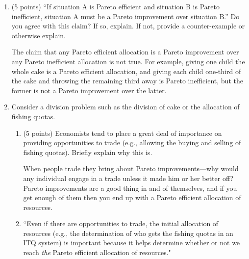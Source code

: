 \documentclass[twoside]{article}
\begin{document}
\begin{enumerate}
\item \begin{EXAM} (5 points) ``If situation A is Pareto efficient and situation B is Pareto inefficient, situation A must be a Pareto improvement over situation B.'' Do you agree with this claim? If so, explain. If not, provide a counter-example or otherwise explain. \clearpage\end{EXAM}

\begin{KEY}
The claim that any Pareto efficient allocation is a Pareto improvement over any Pareto inefficient allocation is not true. For example, giving one child the whole cake is a Pareto efficient allocation, and giving each child one-third of the cake and throwing the remaining third away is Pareto inefficient, but the former is not a Pareto improvement over the latter.
\end{KEY}













\item Consider a division problem such as the division of cake or the allocation of fishing quotas.

    \begin{enumerate}

    \item \begin{EXAM} (5 points) Economists tend to place a great deal of importance on providing opportunities to trade (e.g., allowing the buying and selling of fishing quotas). Briefly explain why this is. \vspace*{1.7in}\end{EXAM}

\begin{KEY} When people trade they bring about Pareto improvements---why would any individual engage in a trade unless it made him or her better off? Pareto improvements are a good thing in and of themselves, and if you get enough of them then you end up with a Pareto efficient allocation of resources.
\end{KEY}


    \item \begin{EXAM} ``Even if there are opportunities to trade, the initial allocation of resources (e.g., the determination of who gets the fishing quotas in an ITQ system) is important because it helps determine whether or not we reach \emph{the} Pareto efficient allocation of resources." \end{EXAM}


\end{enumerate}
\end{enumerate}
\end{document}
